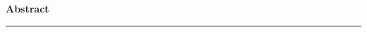 \vspace*{\fill}
\begin{center}
\textrm{\bfseries\Huge Abstract}%
\end{center}%

\vspace{1em}

\lipsum[1]
\begin{center}
    {\color{figcaption}\rule{0.75\textwidth}{0.1pt}}
\end{center}
